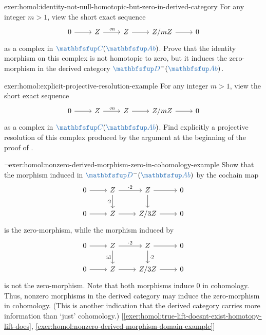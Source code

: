 \begin{exer}{}{exer:homol:identity-not-null-homotopic-but-zero-in-derived-category}
  For any integer $m > 1$, view the short exact sequence
  \[\begin{tikzcd}
      0 \arrow[r] & \Z \arrow[r, "\cdot m"] & \Z \arrow[r] & \Z/m\Z
      \arrow[r] & 0
    \end{tikzcd}\] as a complex in $\categ{C}(\categ{Ab})$. Prove that
  the identity morphism on this complex is not homotopic to zero, but
  it induces the zero-morphism in the derived category
  $\categ{D}^-(\categ{Ab})$.
\end{exer}
\begin{exer}{}{exer:homol:explicit-projective-resolution-example}
  For any integer $m > 1$, view the short exact sequence
  \[\begin{tikzcd}
      0 \arrow[r] & \Z \arrow[r, "\cdot m"] & \Z \arrow[r] & \Z/m\Z
      \arrow[r] & 0
    \end{tikzcd}\] as a complex in $\categ{C}(\categ{Ab})$. Find
  explicitly a projective resolution of this complex produced by the
  argument at the beginning of the proof of .
\end{exer}
\begin{exer}{$\lnot$}{exer:homol:nonzero-derived-morphism-zero-in-cohomology-example}
  Show that the morphism induced in $\categ{D}^-(\categ{Ab})$ by the
  cochain map
  \[\begin{tikzcd}
      0 \arrow[r] & \Z \arrow[r, "\cdot 2"] \arrow[d, "\cdot 2"'] &
      \Z \arrow[r] \arrow[d] & 0 \\
      0 \arrow[r] & \Z \arrow[r] & \Z/3\Z \arrow[r] & 0
    \end{tikzcd}\] is the zero-morphism, while the morphism induced by
  \[\begin{tikzcd}
      0 \arrow[r] & \Z \arrow[r, "\cdot 2"] \arrow[d, "\id"'] &
      \Z \arrow[r] \arrow[d, "\cdot 2"] & 0 \\
      0 \arrow[r] & \Z \arrow[r] & \Z/3\Z \arrow[r] & 0
    \end{tikzcd}\] is not the zero-morphism. Note that both morphisms
  induce $0$ in cohomology. Thus, nonzero morphisms in the derived
  category may induce the zero-morphism in cohomology. (This is
  another indication that the derived category carries more
  information than `just' cohomology.)
  [\ref{exer:homol:true-lift-doesnt-exist-homotopy-lift-does},
  \ref{exer:homol:nonzero-derived-morphism-domain-example}]
\end{exer}
